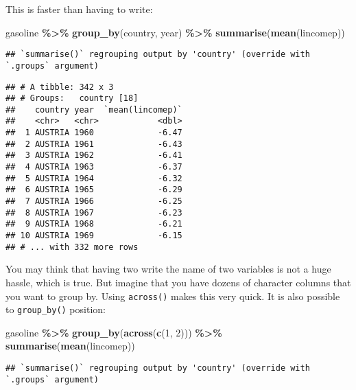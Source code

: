 \documentclass[
]{article}
\newenvironment{Shaded}{\begin{snugshade}}{\end{snugshade}}
\newcommand{\DecValTok}[1]{\textcolor[rgb]{0.00,0.00,0.81}{#1}}
\newcommand{\KeywordTok}[1]{\textcolor[rgb]{0.13,0.29,0.53}{\textbf{#1}}}
\newcommand{\NormalTok}[1]{#1}
\newcommand{\OperatorTok}[1]{\textcolor[rgb]{0.81,0.36,0.00}{\textbf{#1}}}
\newcommand{\StringTok}[1]{\textcolor[rgb]{0.31,0.60,0.02}{#1}}
\begin{document}
This is faster than having to write:

\begin{Shaded}
\begin{Highlighting}[]
\NormalTok{gasoline }\OperatorTok{\%\textgreater{}\%}
\StringTok{    }\KeywordTok{group\_by}\NormalTok{(country, year) }\OperatorTok{\%\textgreater{}\%}
\StringTok{    }\KeywordTok{summarise}\NormalTok{(}\KeywordTok{mean}\NormalTok{(lincomep))}
\end{Highlighting}
\end{Shaded}

\begin{verbatim}
## `summarise()` regrouping output by 'country' (override with `.groups` argument)
\end{verbatim}

\begin{verbatim}
## # A tibble: 342 x 3
## # Groups:   country [18]
##    country year  `mean(lincomep)`
##    <chr>   <chr>            <dbl>
##  1 AUSTRIA 1960             -6.47
##  2 AUSTRIA 1961             -6.43
##  3 AUSTRIA 1962             -6.41
##  4 AUSTRIA 1963             -6.37
##  5 AUSTRIA 1964             -6.32
##  6 AUSTRIA 1965             -6.29
##  7 AUSTRIA 1966             -6.25
##  8 AUSTRIA 1967             -6.23
##  9 AUSTRIA 1968             -6.21
## 10 AUSTRIA 1969             -6.15
## # ... with 332 more rows
\end{verbatim}

You may think that having two write the name of two variables is not a huge hassle, which is true.
But imagine that you have dozens of character columns that you want to group by. Using \texttt{across()}
makes this very quick. It is also possible to \texttt{group\_by()} position:

\begin{Shaded}
\begin{Highlighting}[]
\NormalTok{gasoline }\OperatorTok{\%\textgreater{}\%}
\StringTok{    }\KeywordTok{group\_by}\NormalTok{(}\KeywordTok{across}\NormalTok{(}\KeywordTok{c}\NormalTok{(}\DecValTok{1}\NormalTok{, }\DecValTok{2}\NormalTok{))) }\OperatorTok{\%\textgreater{}\%}
\StringTok{    }\KeywordTok{summarise}\NormalTok{(}\KeywordTok{mean}\NormalTok{(lincomep))}
\end{Highlighting}
\end{Shaded}

\begin{verbatim}
## `summarise()` regrouping output by 'country' (override with `.groups` argument)
\end{verbatim}
\end{document}
